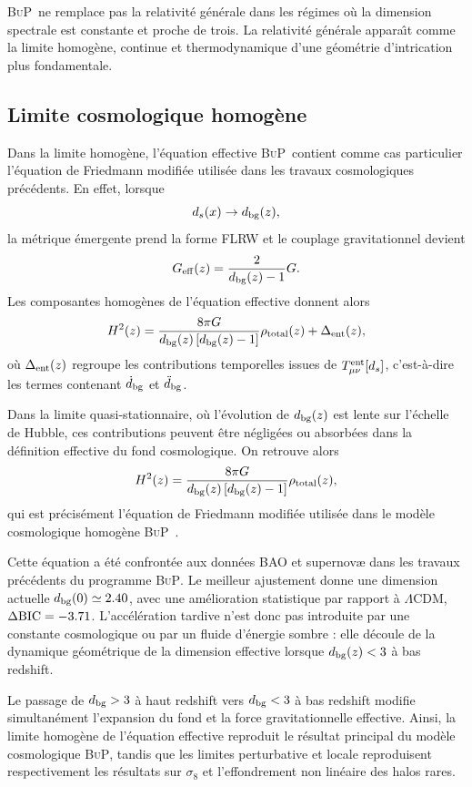 \documentclass[11pt]{article}
\newcommand{\Geff}{G_{\rm eff}}
\newcommand{\sig}{\sigma_8}
\newcommand{\LCDM}{\Lambda\mathrm{CDM}}
\newcommand{\BuP}{\textsc{BuP}}
\newcommand{\ent}{\rm ent}
\begin{document}
\BuP\ ne remplace pas la relativit\'e g\'en\'erale dans les r\'egimes o\`u la dimension
spectrale est constante et proche de trois. La relativit\'e g\'en\'erale appara\^{\i}t
comme la limite homog\`ene, continue et thermodynamique d'une g\'eom\'etrie d'intrication
plus fondamentale.

\subsection{Limite cosmologique homog\`ene}

Dans la limite homog\`ene, l'\'equation effective \BuP\ contient comme cas particulier
l'\'equation de Friedmann modifi\'ee utilis\'ee dans les travaux cosmologiques
pr\'ec\'edents. En effet, lorsque
\[
d_s(x)\rightarrow d_{\rm bg}(z),
\]
la m\'etrique \'emergente prend la forme FLRW et le couplage gravitationnel devient
\[
\Geff(z)=\frac{2}{d_{\rm bg}(z)-1}G.
\]
Les composantes homog\`enes de l'\'equation effective donnent alors
\[
H^2(z)
=
\frac{8\pi G}{d_{\rm bg}(z)\left[d_{\rm bg}(z)-1\right]}
\rho_{\rm total}(z)
+
\Delta_{\rm ent}(z),
\]
o\`u $\Delta_{\rm ent}(z)$ regroupe les contributions temporelles issues de
$T_{\mu\nu}^{\ent}[d_s]$, c'est-\`a-dire les termes contenant $\dot d_{\rm bg}$
et $\ddot d_{\rm bg}$.

Dans la limite quasi-stationnaire, o\`u l'\'evolution de $d_{\rm bg}(z)$ est lente
sur l'\'echelle de Hubble, ces contributions peuvent \^etre n\'eglig\'ees ou absorb\'ees
dans la d\'efinition effective du fond cosmologique. On retrouve alors
\[
H^2(z)
=
\frac{8\pi G}{d_{\rm bg}(z)\left[d_{\rm bg}(z)-1\right]}
\rho_{\rm total}(z),
\]
qui est pr\'ecis\'ement l'\'equation de Friedmann modifi\'ee utilis\'ee dans le
mod\`ele cosmologique homog\`ene \BuP~\cite{hamdad2026bup}.

Cette \'equation a \'et\'e confront\'ee aux donn\'ees BAO et supernovæ dans les travaux
pr\'ec\'edents du programme \BuP. Le meilleur ajustement donne une dimension actuelle
$d_{\rm bg}(0)\simeq 2.40$, avec une am\'elioration statistique par rapport \`a $\LCDM$,
$\Delta{\rm BIC}=-3.71$.
L'acc\'el\'eration tardive n'est donc pas introduite par une constante cosmologique ou par
un fluide d'\'energie sombre : elle d\'ecoule de la dynamique g\'eom\'etrique de la
dimension effective lorsque $d_{\rm bg}(z)<3$ \`a bas redshift.

Le passage de $d_{\rm bg}>3$ \`a haut redshift vers $d_{\rm bg}<3$ \`a bas redshift
modifie simultan\'ement l'expansion du fond et la force gravitationnelle effective.
Ainsi, la limite homog\`ene de l'\'equation effective reproduit le r\'esultat principal
du mod\`ele cosmologique \BuP, tandis que les limites perturbative et locale reproduisent
respectivement les r\'esultats sur $\sig$ et l'effondrement non lin\'eaire des halos rares.
\end{document}
